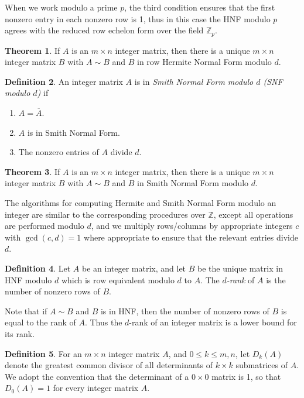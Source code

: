 \documentclass[12pt,a4paper,answers]{exam}
\newcommand{\Z}{\mathbb{Z}}
\theoremstyle{definition}
\newtheorem{theorem}{Theorem}[section]
\newtheorem{definition}[theorem]{Definition}
\begin{document}
When we work modulo a prime $p$, the third condition ensures that the first nonzero entry in each nonzero row is 1, thus in this case the HNF modulo $p$ agrees with the reduced row echelon form over the field $\Z_p$.

\begin{theorem}
  If $A$ is an $m\times n$ integer matrix, then there is a unique $m\times n$ integer matrix $B$ with $A\sim B$ and $B$ in row Hermite Normal Form modulo $d$.
\end{theorem}

\begin{definition}
  An integer matrix $A$ is in \emph{Smith Normal Form modulo $d$ (SNF modulo $d$)} if
  \begin{enumerate}
  \item $A=\overline{A}$.
  \item $A$ is in Smith Normal Form.
  \item The nonzero entries of $A$ divide $d$.
  \end{enumerate}
\end{definition}

\begin{theorem}
  If $A$ is an $m\times n$ integer matrix, then there is a unique $m\times n$ integer matrix $B$ with $A\sim B$ and $B$ in Smith Normal Form modulo $d$.
\end{theorem}

The algorithms for computing Hermite and Smith Normal Form modulo an integer are similar to the corresponding procedures over $\Z$, except all operations are performed modulo $d$, and we multiply rows/columns by appropriate integers $c$ with $\gcd(c,d)=1$ where appropriate to ensure that the relevant entries divide $d$.

\begin{definition}
  Let $A$ be an integer matrix, and let $B$ be the unique matrix in HNF modulo $d$ which is row equivalent modulo $d$ to $A$. The \emph{$d$-rank} of $A$ is the number of nonzero rows of $B$.
\end{definition}

Note that if $A\sim B$ and $B$ is in HNF, then the number of nonzero rows of $B$ is equal to the rank of $A$. Thus the $d$-rank of an integer matrix is a lower bound for its rank.

\begin{definition}
  For an $m\times n$ integer matrix $A$, and $0\leq k\leq m,n$, let $D_k(A)$ denote the greatest common divisor of all determinants of $k\times k$ submatrices of $A$. We adopt the convention that the determinant of a $0\times0$ matrix is 1, so that $D_0(A)=1$ for every integer matrix $A$.
\end{definition}
\end{document}
